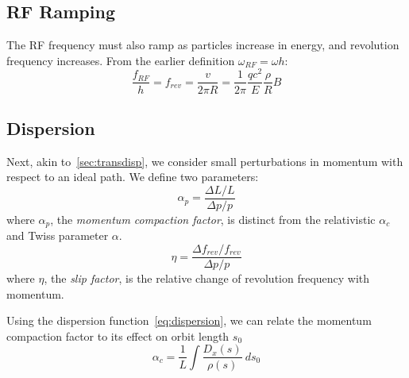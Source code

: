 \documentclass[11pt]{report}
\begin{document}
\subsection{RF Ramping}

The RF frequency must also ramp as particles increase in energy, and revolution frequency increases. From the earlier definition $\omega_{RF} = \omega h$:
\begin{equation}
  \frac{f_{RF}}h = f_{rev} = \frac{v}{2\pi R} = \frac 1{2\pi}\frac{qc^2}E\frac\rho R B
\end{equation}

\subsection{Dispersion}

Next, akin to~\autoref{sec:transdisp}, we consider small perturbations in momentum with respect to an ideal path. We define two parameters:
\begin{equation}
  \alpha_p = \frac{\Delta L/L}{\Delta p/p}
\end{equation} where $\alpha_p$, the \textit{momentum compaction factor}, is distinct from the relativistic $\alpha_c$ and Twiss parameter $\alpha$.
\begin{equation}
  \eta = \frac{\Delta f_{rev}/f_{rev}}{\Delta p/p}
\end{equation} where $\eta$, the \textit{slip factor}, is the relative change of revolution frequency with momentum.

Using the dispersion function~\autoref{eq:dispersion}, we can relate the momentum compaction factor to its effect on orbit length $s_0$~\cite[5.1]{lbd:tecker}
\begin{equation}
  \alpha_c=\frac 1L\int\frac{D_x(s)}{\rho(s)}\ ds_0
\end{equation}
\end{document}
